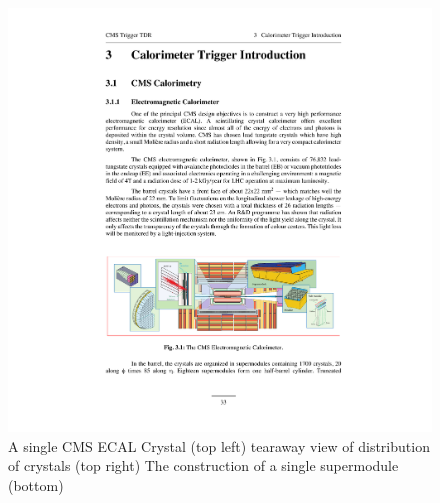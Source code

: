 \begin{figure}
\begin{center}
\includegraphics[width=.95\textwidth]{pics/cms_ecal_parts}
\end{center}
\caption{A single CMS ECAL Crystal (top left) tearaway view of distribution of crystals (top right) The construction of a single supermodule (bottom)   }
\label{fig:ecal_cryastal}
\end{figure}

